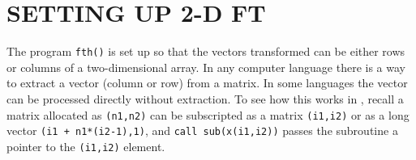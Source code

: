 \section{SETTING UP 2-D FT}
The program {\tt fth()} is set up so that the vectors transformed
can be either rows or columns of a two-dimensional array.
In any computer language there is a way to extract
a vector (column or row) from a matrix.
In some languages the vector can be processed directly without extraction.
To see how this works in ,
recall a matrix allocated as
{\tt (n1,n2)}
can be subscripted as a matrix
{\tt (i1,i2)}
or as a long vector
{\tt (i1 + n1*(i2-1),1)},
and {\tt call sub(x(i1,i2))} passes the subroutine
a pointer to the {\tt (i1,i2)} element.
\begin{comment}
To transform an entire axis, the subroutines
{\tt ft1axis()} and
{\tt ft2axis()} are given.
For a two-dimensional FT,
we simply call both
{\tt ft1axis()} and
{\tt ft2axis()} in either order.%
\progdex{ft1axis}{FT 1-axis}
\progdex{ft2axis}{FT 2-axis}
\end{comment}
\par

